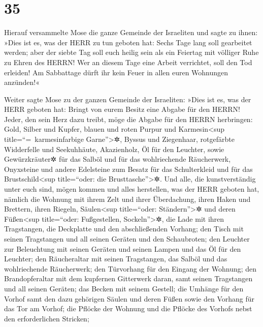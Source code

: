 \hypertarget{section-34}{%
\section{35}\label{section-34}}

 Hierauf versammelte Mose die ganze Gemeinde der
Israeliten und sagte zu ihnen: »Dies ist es, was der HERR zu tun geboten
hat:  Sechs Tage lang soll gearbeitet werden; aber der
siebte Tag soll euch heilig sein als ein Feiertag mit völliger Ruhe zu
Ehren des HERRN! Wer an diesem Tage eine Arbeit verrichtet, soll den Tod
erleiden!  Am Sabbattage dürft ihr kein Feuer in allen
euren Wohnungen anzünden!«

 Weiter sagte Mose zu der ganzen Gemeinde der Israeliten:
»Dies ist es, was der HERR geboten hat:  Bringt von eurem
Besitz eine Abgabe für den HERRN! Jeder, den sein Herz dazu treibt, möge
die Abgabe für den HERRN herbringen: Gold, Silber und Kupfer,
 blauen und roten Purpur und Karmesin\textless sup
title=``=~karmesinfarbige Garne''\textgreater✲, Byssus und Ziegenhaar,
 rotgefärbte Widderfelle und Seekuhhäute, Akazienholz,
 Öl für den Leuchter, sowie Gewürzkräuter✲ für das Salböl
und für das wohlriechende Räucherwerk,  Onyxsteine und
andere Edelsteine zum Besatz für das Schulterkleid und für das
Brustschild\textless sup title=``oder: die Brusttasche''\textgreater✲.
 Und alle, die kunstverständig unter euch sind, mögen
kommen und alles herstellen, was der HERR geboten hat, 
nämlich die Wohnung mit ihrem Zelt und ihrer Überdachung, ihren Haken
und Brettern, ihren Riegeln, Säulen\textless sup title=``oder:
Ständern''\textgreater✲ und deren Füßen\textless sup title=``oder:
Fußgestellen, Sockeln''\textgreater✲,  die Lade mit ihren
Tragstangen, die Deckplatte und den abschließenden Vorhang;
 den Tisch mit seinen Tragstangen und all seinen Geräten
und den Schaubroten;  den Leuchter zur Beleuchtung mit
seinen Geräten und seinen Lampen und das Öl für den Leuchter;
 den Räucheraltar mit seinen Tragstangen, das Salböl und
das wohlriechende Räucherwerk;  den Türvorhang für den
Eingang der Wohnung; den Brandopferaltar mit dem kupfernen Gitterwerk
daran, samt seinen Tragstangen und all seinen Geräten; das Becken mit
seinem Gestell;  die Umhänge für den Vorhof samt den dazu
gehörigen Säulen und deren Füßen sowie den Vorhang für das Tor am
Vorhof;  die Pflöcke der Wohnung und die Pflöcke des
Vorhofs nebst den erforderlichen Stricken; 

